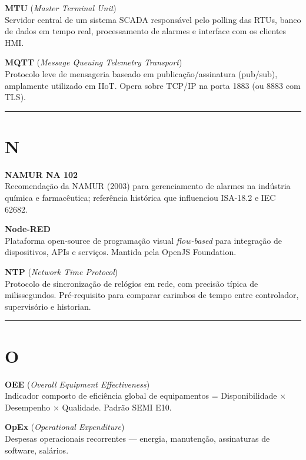 \textbf{MTU} (\emph{Master Terminal Unit})\\
Servidor central de um sistema SCADA responsável pelo polling das RTUs, banco de dados em tempo real, processamento de alarmes e interface com os clientes HMI.

\textbf{MQTT} (\emph{Message Queuing Telemetry Transport})\\
Protocolo leve de mensageria baseado em publicação/assinatura (pub/sub), amplamente utilizado em IIoT. Opera sobre TCP/IP na porta 1883 (ou 8883 com TLS).

\begin{center}\rule{0.5\linewidth}{0.5pt}\end{center}

\section{N}\label{n}

\textbf{NAMUR NA 102}\\
Recomendação da NAMUR (2003) para gerenciamento de alarmes na indústria química e farmacêutica; referência histórica que influenciou ISA-18.2 e IEC 62682.

\textbf{Node-RED}\\
Plataforma open-source de programação visual \emph{flow-based} para integração de dispositivos, APIs e serviços. Mantida pela OpenJS Foundation.

\textbf{NTP} (\emph{Network Time Protocol})\\
Protocolo de sincronização de relógios em rede, com precisão típica de milissegundos. Pré-requisito para comparar carimbos de tempo entre controlador, supervisório e historian.

\begin{center}\rule{0.5\linewidth}{0.5pt}\end{center}

\section{O}\label{o}

\textbf{OEE} (\emph{Overall Equipment Effectiveness})\\
Indicador composto de eficiência global de equipamentos = Disponibilidade \ensuremath{\times} Desempenho \ensuremath{\times} Qualidade. Padrão SEMI E10.

\textbf{OpEx} (\emph{Operational Expenditure})\\
Despesas operacionais recorrentes --- energia, manutenção, assinaturas de software, salários.

